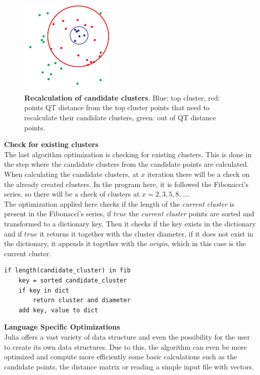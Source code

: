 \begin{figure}[h]
    \centering
    \includegraphics[width=0.4\textwidth]{images/CANDIDATE_2.png}
    \caption{\textbf{Recalculation of candidate clusters}. Blue: top cluster, red: points QT distance from the top cluster points that need to recalculate their candidate clusters, green: out of QT distance points.}
    \label{fig:candidate_clusters}
\end{figure}

\noindent \textbf{Check for existing clusters}\\
The last algorithm optimization is checking for existing clusters. This is done in the step where the candidate clusters from the candidate points are calculated. When calculating the candidate clusters, at $x$ iteration there will be a check on the already created clusters. In the program here, it is followed the Fibonacci's series, so there will be a check of clusters at $x = 2,3,5,8,...$.\\

The optimization applied here checks if the length of the \textit{current cluster} is present in the Fibonacci's series, if $true$ the \textit{current cluster} points are sorted and transformed to a dictionary key. Then it checks if the key exists in the dictionary and if $true$ it returns it together with the cluster diameter, if it does not exist in the dictionary, it appends it together with the \textit{origin}, which in this case is the current cluster. 

\begin{verbatim}
if length(candidate_cluster) in fib
    key = sorted candidate_cluster
	if key in dict		
		return cluster and diameter
	add key, value to dict
\end{verbatim}

\noindent \textbf{Language Specific Optimizations}\\
Julia offers a vast variety of data structure and even the possibility for the user to create its own data structures. Due to this, the algorithm can even be more optimized and compute more efficiently some basic calculations such as the candidate points, the distance matrix or reading a simple input file with vectors. \\

